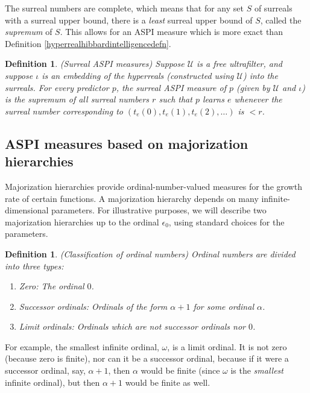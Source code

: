 \documentclass{article}
\newtheorem{definition}[theorem]{Definition}
\begin{document}
The surreal numbers are complete, which means that for
any set $S$ of surreals with a surreal upper bound,
there is a \emph{least} surreal upper bound of $S$, called the \emph{supremum} of $S$.
This allows for an ASPI measure which is more exact
than Definition \ref{hyperrealhibbardintelligencedefn}.

\begin{definition}
\label{surrealhibbardintelligencedefn}
    (Surreal ASPI measures)
    Suppose $\mathcal U$ is a free ultrafilter, and suppose $\iota$ is an embedding
    of the hyperreals (constructed using $\mathcal U$) into the surreals.
    For every predictor $p$, the \emph{surreal ASPI measure} of $p$ (given
    by $\mathcal U$ and $\iota$)
    is the supremum of all surreal numbers $r$ such that
    $p$ learns $e$ whenever the surreal number corresponding to
    $(t_e(0),t_e(1),t_e(2),\ldots)$ is $<r$.
\end{definition}

\subsection{ASPI measures based on majorization hierarchies}

Majorization hierarchies \cite{weiermann2002slow}
provide ordinal-number-valued measures for the growth
rate of certain functions. A majorization hierarchy depends
on many infinite-dimensional parameters. For illustrative purposes,
we will describe two majorization hierarchies up to the ordinal $\epsilon_0$,
using standard choices for the parameters.

\begin{definition}
    (Classification of ordinal numbers)
    Ordinal numbers are divided into three types:
    \begin{enumerate}
        \item Zero: The ordinal $0$.
        \item Successor ordinals: Ordinals of the form $\alpha+1$ for some ordinal $\alpha$.
        \item Limit ordinals: Ordinals which are not successor ordinals nor $0$.
    \end{enumerate}
\end{definition}

For example, the smallest infinite ordinal, $\omega$, is a limit ordinal. It is not zero
(because zero is finite),
nor can it be a successor ordinal, because if it were a successor ordinal, say, $\alpha+1$,
then $\alpha$ would be finite (since $\omega$ is the \emph{smallest} infinite ordinal),
but then $\alpha+1$ would be finite as well.
\end{document}
